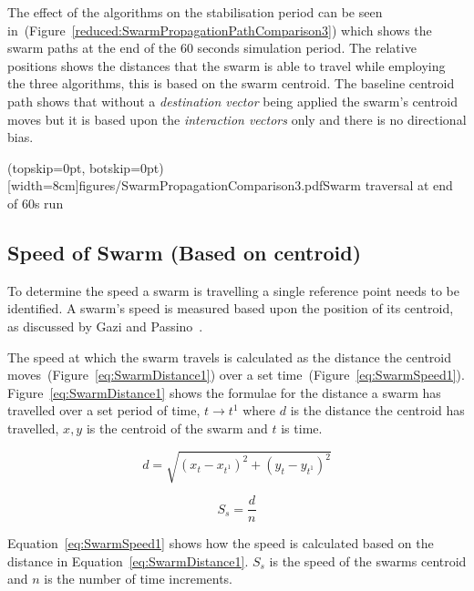 \documentclass{ieeeaccess}
\begin{document}
The effect of the algorithms on the stabilisation period can be seen in~(Figure~\ref{reduced:SwarmPropagationPathComparison3}) which shows the swarm paths at the end of the 60 seconds simulation period. The relative positions shows the distances that the swarm is able to travel while employing the three algorithms, this is based on the swarm centroid. The baseline centroid path shows that without a \textit{destination vector} being applied the swarm's centroid moves but it is based upon the \textit{interaction vectors} only and there is no directional bias.


\Figure[t!](topskip=0pt, botskip=0pt)[width=8cm]{figures/SwarmPropagationComparison3.pdf}{Swarm traversal at end of 60s run\label{reduced:SwarmPropagationPathComparison3}}

\subsection{Speed of Swarm (Based on centroid)}
To determine the speed a swarm is travelling a single reference point needs to be identified. A swarm's speed is measured based upon the position of its centroid, as discussed by Gazi and Passino~\cite{GP:04, GP:02}.

The speed at which the swarm travels is calculated as the distance the centroid moves~(Figure~\ref{eq:SwarmDistance1}) over a set time~(Figure~\ref{eq:SwarmSpeed1}). Figure~\ref{eq:SwarmDistance1} shows the formulae for the distance a swarm has travelled over a set period of time, $t \rightarrow t^{1}$ where $d$ is the distance the centroid has travelled, $x,y$ is the centroid of the swarm and $t$ is time.

\begin{equation}\label{eq:SwarmDistance1}
d = \sqrt{(x_{t}-x_{t^1})^2+(y_{t}-y_{t^1})^2}
\end{equation}

\begin{equation}\label{eq:SwarmSpeed1}
S_s = \frac{d}{n}
\end{equation}

Equation~\ref{eq:SwarmSpeed1} shows how the speed is calculated based on the distance in Equation~\ref{eq:SwarmDistance1}. $S_s$ is the speed of the swarms centroid and $n$ is the number of time increments.
\end{document}
